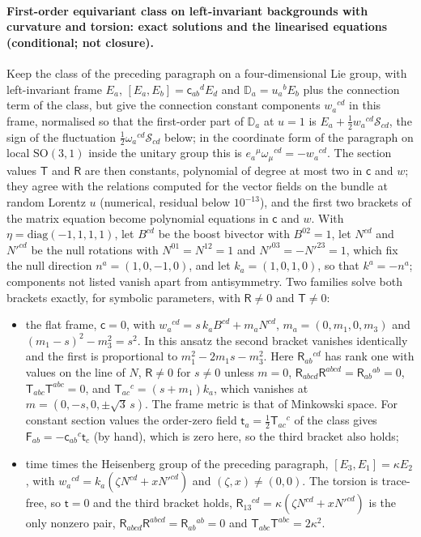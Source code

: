 \paragraph{First-order equivariant class on left-invariant backgrounds with curvature and torsion: exact solutions and the linearised equations (conditional; not closure).}
Keep the class of the preceding paragraph on a four-dimensional Lie group, with left-invariant frame \(E_a\), \([E_a,E_b]=\mathsf c_{ab}{}^dE_d\) and \(\mathbb D_a=u_a{}^bE_b\) plus the connection term of the class, but give the connection constant components \(w_a{}^{cd}\) in this frame, normalised so that the first-order part of \(\mathbb D_a\) at \(u=1\) is \(E_a+\tfrac12w_a{}^{cd}\mathcal S_{cd}\), the sign of the fluctuation \(\tfrac12\omega_a{}^{cd}\mathcal S_{cd}\) below; in the coordinate form of the paragraph on local \(\mathrm{SO}(3,1)\) inside the unitary group this is \(e_a{}^\mu\omega_\mu{}^{cd}=-w_a{}^{cd}\). The section values \(\mathsf T\) and \(\mathsf R\) are then constants, polynomial of degree at most two in \(\mathsf c\) and \(w\); they agree with the relations computed for the vector fields on the bundle at random Lorentz \(u\) (numerical, residual below \(10^{-13}\)), and the first two brackets of the matrix equation become polynomial equations in \(\mathsf c\) and \(w\). With \(\eta=\mathrm{diag}(-1,1,1,1)\), let \(B^{cd}\) be the boost bivector with \(B^{02}=1\), let \(N^{cd}\) and \(N'^{cd}\) be the null rotations with \(N^{01}=N^{12}=1\) and \(N'^{03}=-N'^{23}=1\), which fix the null direction \(n^a=(1,0,-1,0)\), and let \(k_a=(1,0,1,0)\), so that \(k^a=-n^a\); components not listed vanish apart from antisymmetry. Two families solve both brackets exactly, for symbolic parameters, with \(\mathsf R\neq0\) and \(\mathsf T\neq0\):
\begin{itemize}
\item[(i)] the flat frame, \(\mathsf c=0\), with \(w_a{}^{cd}=s\,k_aB^{cd}+m_aN^{cd}\), \(m_a=(0,m_1,0,m_3)\) and \((m_1-s)^2-m_3^2=s^2\). In this ansatz the second bracket vanishes identically and the first is proportional to \(m_1^2-2m_1s-m_3^2\). Here \(\mathsf R_{ab}{}^{cd}\) has rank one with values on the line of \(N\), \(\mathsf R\neq0\) for \(s\neq0\) unless \(m=0\), \(\mathsf R_{abcd}\mathsf R^{abcd}=\mathsf R_{ab}{}^{ab}=0\), \(\mathsf T_{abc}\mathsf T^{abc}=0\), and \(\mathsf T_{ac}{}^c=(s+m_1)k_a\), which vanishes at \(m=(0,-s,0,\pm\sqrt3\,s)\). The frame metric is that of Minkowski space. For constant section values the order-zero field \(\mathsf t_a=\tfrac12\mathsf T_{ac}{}^c\) of the class gives \(\mathsf F_{ab}=-\mathsf c_{ab}{}^c\mathsf t_c\) (by hand), which is zero here, so the third bracket also holds;
\item[(ii)] time times the Heisenberg group of the preceding paragraph, \([E_3,E_1]=\kappa E_2\), with \(w_a{}^{cd}=k_a(\zeta N^{cd}+xN'^{cd})\) and \((\zeta,x)\neq(0,0)\). The torsion is trace-free, so \(\mathsf t=0\) and the third bracket holds, \(\mathsf R_{13}{}^{cd}=\kappa(\zeta N^{cd}+xN'^{cd})\) is the only nonzero pair, \(\mathsf R_{abcd}\mathsf R^{abcd}=\mathsf R_{ab}{}^{ab}=0\) and \(\mathsf T_{abc}\mathsf T^{abc}=2\kappa^2\).
\end{itemize}
